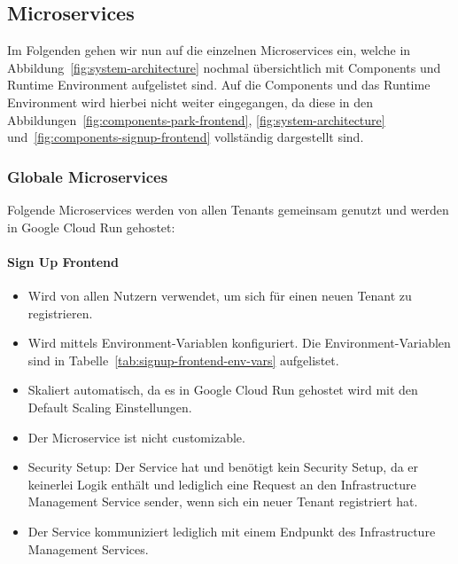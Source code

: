 \subsection{Microservices}
Im Folgenden gehen wir nun auf die einzelnen Microservices ein, welche in Abbildung~\ref{fig:system-architecture} nochmal übersichtlich mit Components und Runtime Environment aufgelistet sind.
Auf die Components und das Runtime Environment wird hierbei nicht weiter eingegangen, da diese in den Abbildungen~\ref{fig:components-park-frontend}, \ref{fig:system-architecture} und~\ref{fig:components-signup-frontend} vollständig dargestellt sind.

\subsubsection{Globale Microservices}
Folgende Microservices werden von allen Tenants gemeinsam genutzt und werden in Google Cloud Run gehostet:

\paragraph{Sign Up Frontend}
\label{sec:signup-frontend}
\begin{itemize}
	\item Wird von allen Nutzern verwendet, um sich für einen neuen Tenant zu registrieren.
	\item Wird mittels Environment-Variablen konfiguriert. Die Environment-Variablen sind in Tabelle~\ref{tab:signup-frontend-env-vars} aufgelistet.
	\item Skaliert automatisch, da es in Google Cloud Run gehostet wird mit den Default Scaling Einstellungen.
	\item Der Microservice ist nicht customizable.
	\item Security Setup: Der Service hat und benötigt kein Security Setup, da er keinerlei Logik enthält und lediglich eine Request an den Infrastructure Management Service sender, wenn sich ein neuer Tenant registriert hat.
	\item Der Service kommuniziert lediglich mit einem Endpunkt des Infrastructure Management Services.
\end{itemize}

